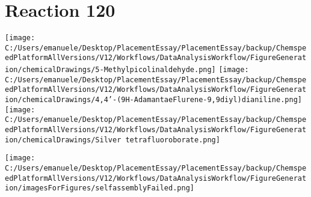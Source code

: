 \documentclass{article}%
\begin{document}
\section*{Reaction 120}%
%
\begin{scheme}[H]%
\begin{minipage}{0.5\textwidth}%
\texttt{[image: C:/Users/emanuele/Desktop/PlacementEssay/PlacementEssay/backup/ChemspeedPlatformAllVersions/V12/Workflows/DataAnalysisWorkflow/FigureGeneration/chemicalDrawings/5-Methylpicolinaldehyde.png]}%
\texttt{[image: C:/Users/emanuele/Desktop/PlacementEssay/PlacementEssay/backup/ChemspeedPlatformAllVersions/V12/Workflows/DataAnalysisWorkflow/FigureGeneration/chemicalDrawings/4,4'-(9H-AdamantaeFlurene-9,9diyl)dianiline.png]}%
\texttt{[image: C:/Users/emanuele/Desktop/PlacementEssay/PlacementEssay/backup/ChemspeedPlatformAllVersions/V12/Workflows/DataAnalysisWorkflow/FigureGeneration/chemicalDrawings/Silver tetrafluoroborate.png]}%
\end{minipage}%
\begin{minipage}{0.5\textwidth}%
\begin{center}%
\texttt{[image: C:/Users/emanuele/Desktop/PlacementEssay/PlacementEssay/backup/ChemspeedPlatformAllVersions/V12/Workflows/DataAnalysisWorkflow/FigureGeneration/imagesForFigures/selfassemblyFailed.png]}%
\end{center}%
\end{minipage}%
\caption{Self-assembly of components 3, 13, with Silver(I) in a 3.0:1.5:1.0 molar ratio in CH$_3$CN at 60\textdegree C for 40h. These are the reagents (starting materials) for reaction 120.}%
\end{scheme}%
\end{document}
